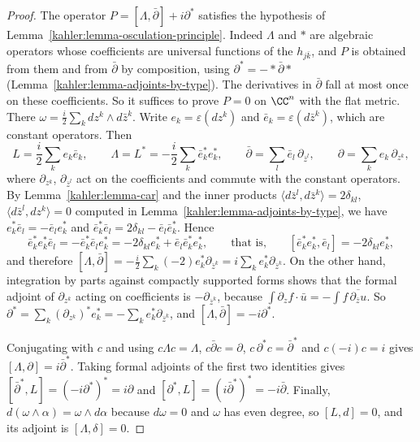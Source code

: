 \begin{proof}
The operator $P = [\Lambda, \bar\partial] + i\partial^*$ satisfies the hypothesis of
Lemma~\ref{kahler:lemma-osculation-principle}. Indeed $\Lambda$ and $*$ are algebraic operators whose coefficients are
universal functions of the $h_{j\bar k}$, and $P$ is obtained from them and from $\bar\partial$ by composition, using
$\partial^* = -*\bar\partial*$ (Lemma~\ref{kahler:lemma-adjoints-by-type}). The derivatives in $\bar\partial$ fall at most
once on these coefficients. So it suffices to prove $P = 0$ on $\CC^n$ with the flat metric. There $\omega = \frac{i}{2}\sum_kdz^k \wedge d\bar z^k$.
Write $e_k = \varepsilon(dz^k)$ and $\bar e_k = \varepsilon(d\bar z^k)$, which are constant operators. Then
\[
L = \frac{i}{2}\sum_ke_k\bar e_k, \qquad \Lambda = L^* = -\frac{i}{2}\sum_k\bar e_k^*e_k^*, \qquad \bar\partial = \sum_l\bar e_l\,\partial_{\bar z^l},
\qquad \partial = \sum_ke_k\,\partial_{z^k},
\]
where $\partial_{z^k}$, $\partial_{\bar z^l}$ act on the coefficients and commute with the constant operators. By
Lemma~\ref{kahler:lemma-car} and the inner products $\langle d\bar z^l, d\bar z^k\rangle = 2\delta_{kl}$,
$\langle d\bar z^l, dz^k\rangle = 0$ computed in Lemma~\ref{kahler:lemma-adjoints-by-type}, we have
$e_k^*\bar e_l = -\bar e_le_k^*$ and $\bar e_k^*\bar e_l = 2\delta_{kl} - \bar e_l\bar e_k^*$. Hence
\[
\bar e_k^*e_k^*\bar e_l = -\bar e_k^*\bar e_le_k^* = -2\delta_{kl}e_k^* + \bar e_l\bar e_k^*e_k^*,
\qquad\text{that is,}\qquad [\bar e_k^*e_k^*, \bar e_l] = -2\delta_{kl}e_k^*,
\]
and therefore $[\Lambda, \bar\partial] = -\frac{i}{2}\sum_k(-2)e_k^*\partial_{\bar z^k} = i\sum_ke_k^*\partial_{\bar z^k}$. On the other hand,
integration by parts against compactly supported forms shows that the formal adjoint of $\partial_{z^k}$ acting on coefficients is
$-\partial_{\bar z^k}$, because $\int\partial_{z}f\cdot\bar u = -\int f\,\overline{\partial_{\bar z}u}$. So
$\partial^* = \sum_k(\partial_{z^k})^*e_k^* = -\sum_ke_k^*\partial_{\bar z^k}$, and $[\Lambda, \bar\partial] = -i\partial^*$.

Conjugating with $c$ and using $c\Lambda c = \Lambda$, $c\bar\partial c = \partial$, $c\,\partial^*c = \bar\partial^*$ and $c(-i)c = i$ gives
$[\Lambda, \partial] = i\bar\partial^*$. Taking formal adjoints of the first two identities gives
$[\bar\partial^*, L] = (-i\partial^*)^* = i\partial$ and $[\partial^*, L] = (i\bar\partial^*)^* = -i\bar\partial$. Finally,
$d(\omega \wedge \alpha) = \omega \wedge d\alpha$ because $d\omega = 0$ and $\omega$ has even degree, so $[L, d] = 0$, and its adjoint is
$[\Lambda, \delta] = 0$.
\end{proof}


